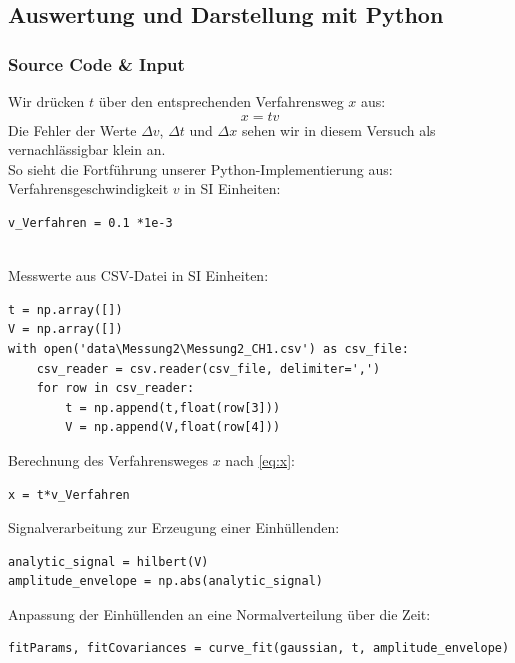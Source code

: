 \documentclass[a4paper,10pt]{article}
\begin{document}
\subsection{Auswertung und Darstellung mit Python}
\subsubsection{Source Code \& Input}
Wir drücken \(t\) über den entsprechenden Verfahrensweg \(x\) aus:
\begin{equation} \label{eq:x}
	x = tv
\end{equation} 
Die Fehler der Werte \(\Delta v\), \(\Delta t\) und \(\Delta x\) sehen wir in diesem Versuch als vernachlässigbar klein an.\\
So sieht die Fortführung unserer Python-Implementierung aus:\\

Verfahrensgeschwindigkeit \(v\) in SI Einheiten:
\begin{lstlisting}
v_Verfahren = 0.1 *1e-3


\end{lstlisting}

Messwerte aus CSV-Datei in SI Einheiten:\begin{lstlisting}
t = np.array([])
V = np.array([])
with open('data\Messung2\Messung2_CH1.csv') as csv_file:
    csv_reader = csv.reader(csv_file, delimiter=',')
    for row in csv_reader:
        t = np.append(t,float(row[3]))
        V = np.append(V,float(row[4]))

\end{lstlisting}

Berechnung des Verfahrensweges \(x\) nach \eqref{eq:x}:\begin{lstlisting}
x = t*v_Verfahren

\end{lstlisting}

Signalverarbeitung zur Erzeugung  einer Einhüllenden:\begin{lstlisting}
analytic_signal = hilbert(V)
amplitude_envelope = np.abs(analytic_signal)

\end{lstlisting}

Anpassung der Einhüllenden an eine Normalverteilung  über die Zeit:\begin{lstlisting}
fitParams, fitCovariances = curve_fit(gaussian, t, amplitude_envelope)

\end{lstlisting}
\end{document}
